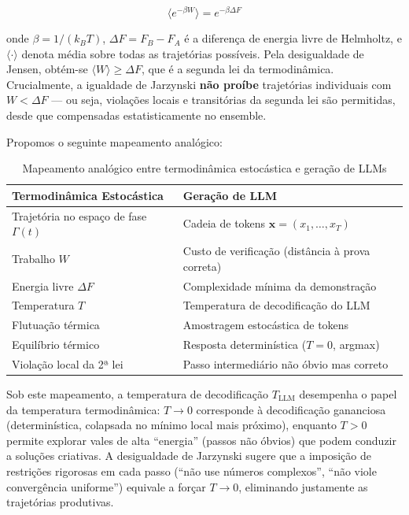 \documentclass[5p]{elsarticle}
\theoremstyle{remark}
\begin{document}
\begin{equation}
\langle e^{-\beta W} \rangle = e^{-\beta \Delta F}
\label{eq:jarzynski}
\end{equation}

onde $\beta = 1/(k_B T)$, $\Delta F = F_B - F_A$ é a diferença de energia livre de Helmholtz, e $\langle \cdot \rangle$ denota média sobre todas as trajetórias possíveis. Pela desigualdade de Jensen, obtém-se $\langle W \rangle \geq \Delta F$, que é a segunda lei da termodinâmica. Crucialmente, a igualdade de Jarzynski \textbf{não proíbe} trajetórias individuais com $W < \Delta F$ --- ou seja, violações locais e transitórias da segunda lei são permitidas, desde que compensadas estatisticamente no ensemble.

Propomos o seguinte mapeamento analógico:

\begin{table}[htbp]
\centering
\caption{Mapeamento analógico entre termodinâmica estocástica e geração de LLMs}
\label{tab:mapping}
\begin{tabular}{L{5cm} L{5cm}}
\toprule
\textbf{Termodinâmica Estocástica} & \textbf{Geração de LLM} \\
\midrule
Trajetória no espaço de fase $\Gamma(t)$ & Cadeia de tokens $\mathbf{x} = (x_1, \ldots, x_T)$ \\
Trabalho $W$ & Custo de verificação (distância à prova correta) \\
Energia livre $\Delta F$ & Complexidade mínima da demonstração \\
Temperatura $T$ & Temperatura de decodificação do LLM \\
Flutuação térmica & Amostragem estocástica de tokens \\
Equilíbrio térmico & Resposta determinística ($T = 0$, argmax) \\
Violação local da 2ª lei & Passo intermediário não óbvio mas correto \\
\bottomrule
\end{tabular}
\end{table}

Sob este mapeamento, a temperatura de decodificação $T_{\text{LLM}}$ desempenha o papel da temperatura termodinâmica: $T \to 0$ corresponde à decodificação gananciosa (determinística, colapsada no mínimo local mais próximo), enquanto $T > 0$ permite explorar vales de alta ``energia'' (passos não óbvios) que podem conduzir a soluções criativas. A desigualdade de Jarzynski sugere que a imposição de restrições rigorosas em cada passo (``não use números complexos'', ``não viole convergência uniforme'') equivale a forçar $T \to 0$, eliminando justamente as trajetórias produtivas.
\end{document}
